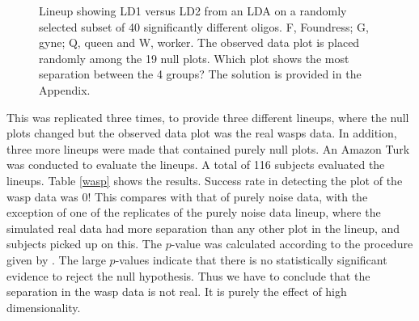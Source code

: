 \documentclass[12]{article}
\begin{document}
\begin{figure}[hbtp]
   \centering
       \caption{Lineup showing LD1 versus LD2 from an LDA on a randomly selected subset of 40 significantly different oligos. F, Foundress; G, gyne; Q, queen and W, worker. The observed data plot is placed randomly among the 19 null plots. Which plot shows the most separation between the 4 groups? The solution is provided in the Appendix.}
       \label{toth_lineup}
\end{figure} 

This was replicated three times, to provide three different lineups, where the null plots changed but the observed data plot was the real wasps data. In addition, three more lineups were made that contained purely null plots. An Amazon Turk was conducted to evaluate the lineups.  A total of 116 subjects evaluated the lineups. Table \ref{wasp} shows the results. Success rate in detecting the plot of the wasp data was 0! This compares with that of purely noise data, with the exception of one of the replicates of the purely noise data lineup, where the simulated real data had more separation than any other plot in the lineup, and subjects picked up on this. The $p$-value was calculated according to the procedure given by \cite{majumder:2011}. The large $p$-values indicate that there is no statistically significant evidence to reject the null hypothesis. Thus we have to conclude that the separation in the wasp data is not real. It is purely the effect of high dimensionality. 
\end{document}

